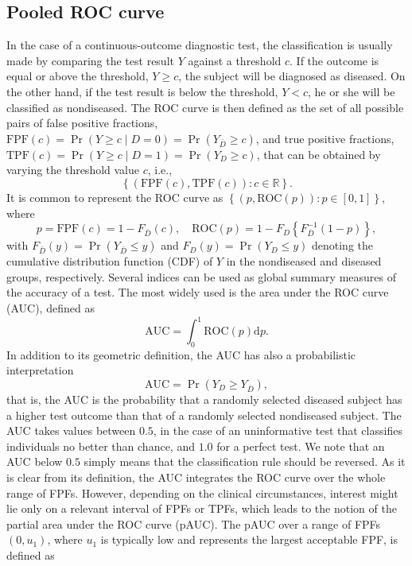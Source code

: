 \subsection{Pooled ROC curve}\label{sec:pooledroc}
In the case of a continuous-outcome diagnostic test, the classification is usually made by comparing the test result $Y$ against a threshold $c$. If the outcome is equal or above the threshold, $Y \geq c$, the subject will be diagnosed as diseased. On the other hand, if the test result is below the threshold, $Y < c$, he or she will be classified as nondiseased. The ROC curve is then defined as the set of all possible pairs of false positive fractions, $\text{FPF}\left(c\right) = \Pr(Y \geq c \mid D = 0) = \Pr(Y_{\bar{D}} \geq c)$, and true positive fractions, $\text{TPF}\left(c\right) = \Pr(Y \geq c \mid D = 1) = \Pr(Y_D \geq c)$, that can be obtained by varying the threshold value $c$, i.e.,
\[
\left\{\left(\text{FPF}\left(c\right), \text{TPF}\left(c\right)\right): c \in \mathbb{R} \right\}.
\]
It is common to represent the ROC curve as $\left\{\left(p, \text{ROC}(p)\right): p \in [0,1] \right\}$, where
\begin{equation} 
p=\text{FPF}(c) = 1 -F_{\bar{D}}(c),\quad \text{ROC}(p) = 1 - F_D\left\{F_{\bar{D}}^{-1}(1-p)\right\},
\label{ROC}
\end{equation}
with $F_{\bar{D}}\left(y\right) = \Pr(Y_{\bar{D}} \leq y)$ and $F_{D}\left(y\right) = \Pr(Y_{D} \leq y)$ denoting the cumulative distribution function (CDF) of $Y$ in the nondiseased and diseased groups, respectively. Several indices can be used as global summary measures of the accuracy of a test. The most widely used is the area under the ROC curve (AUC), defined as
\begin{equation}
\text{AUC} = \int_{0}^{1}\text{ROC}\left(p\right)\text{d}p.
\label{AUC1}
\end{equation}
In addition to its geometric definition, the AUC has also a probabilistic interpretation \citep[see, e.g.,][p. 78]{Pepe03}
\begin{equation}
\text{AUC} = \Pr\left(Y_{D} \geq Y_{\bar{D}}\right),
\label{AUC2}
\end{equation}
that is, the AUC is the probability that a randomly selected diseased subject has a higher test outcome than that of a randomly selected nondiseased subject. The AUC takes values between $0.5$, in the case of an uninformative test that classifies individuals no better than chance, and $1.0$ for a perfect test. We note that an AUC below $0.5$ simply means that the classification rule should be reversed. As it is clear from its definition, the AUC integrates the ROC curve over the whole range of FPFs. However, depending on the clinical circumstances, interest might lie only on a relevant interval of FPFs or TPFs, which leads to the notion of the partial area under the ROC curve (pAUC). The pAUC over a range of FPFs $\left(0, u_1\right)$, where $u_1$ is typically low and represents the largest acceptable FPF, is defined as
